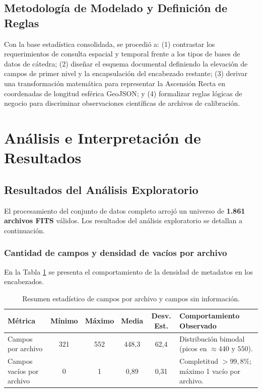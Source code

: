 \documentclass[10pt]{article}
\begin{document}
\subsection{Metodología de Modelado y Definición de Reglas}
Con la base estadística consolidada, se procedió a: (1) contrastar los requerimientos de consulta espacial y temporal frente a los tipos de bases de datos de cátedra; (2) diseñar el esquema documental definiendo la elevación de campos de primer nivel y la encapsulación del encabezado restante; (3) derivar una transformación matemática para representar la Ascensión Recta en coordenadas de longitud esférica GeoJSON; y (4) formalizar reglas lógicas de negocio para discriminar observaciones científicas de archivos de calibración.

\section{Análisis e Interpretación de Resultados}\label{sec:resultados}

\subsection{Resultados del Análisis Exploratorio}
El procesamiento del conjunto de datos completo arrojó un universo de \textbf{1.861 archivos FITS} válidos. Los resultados del análisis exploratorio se detallan a continuación.

\subsubsection{Cantidad de campos y densidad de vacíos por archivo}
En la Tabla \ref{tab:resumen_campos} se presenta el comportamiento de la densidad de metadatos en los encabezados.

\begin{table}[ht]
\centering
\small
\caption{Resumen estadístico de campos por archivo y campos sin información.}
\label{tab:resumen_campos}
\begin{tabularx}{\textwidth}{lccccX}
\toprule
\textbf{Métrica} & \textbf{Mínimo} & \textbf{Máximo} & \textbf{Media} & \textbf{Desv. Est.} & \textbf{Comportamiento Observado} \\
\midrule
Campos por archivo & 321 & 552 & 448,3 & 62,4 & Distribución bimodal (picos en $\approx 440$ y $550$). \\
Campos vacíos por archivo & 0 & 1 & 0,89 & 0,31 & Completitud $>99,8\%$; máximo 1 vacío por archivo. \\
\bottomrule
\end{tabularx}
\end{table}
\end{document}
